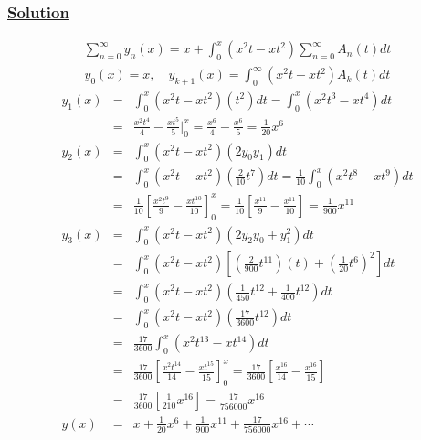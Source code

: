 \documentclass[11pt]{report}
\newcommand{\ubt}[1]{\textbf{\underline{#1}}}
\newcommand{\sps}{\\[0.2cm]}
\newcommand{\solution}{\subsubsection{\ubt{Solution}}}
\begin{document}
		\solution
		\begin{eqnarray*}
			\sum_{n=0}^\infty y_n(x) = x +\int_0^x (x^2 t - xt^2) \sum_{n=0}^\infty A_n(t) dt
		\end{eqnarray*}
		\begin{eqnarray*}
			y_0(x) = x,\quad y_{k+1}(x) = \int_0^\infty (x^2t-xt^2)A_k(t)dt
		\end{eqnarray*}
		\begin{eqnarray*}
			y_1(x) &=& \int_0^x (x^2t-xt^2)(t^2)dt = \int_0^x(x^2t^3-xt^4)dt\sps
			&=& \frac{x^2t^4}{4} - \frac{xt^5}{5}\Bigg|_0^x = \frac{x^6}{4} - \frac{x^6}{5} = \frac{1}{20}x^6\sps
			y_2(x) &=& \int_0^x(x^2t - xt^2)(2y_0y_1)dt\sps
			&=&\int_0^x(x^2t-xt^2)\left(\frac{2}{10}t^7\right)dt = \frac{1}{10}\int_0^x(x^2t^8-xt^9)dt\sps
			&=&\frac{1}{10}\left[ \frac{x^2t^9}{9} - \frac{xt^{10}}{10} \right]_0^x = \frac{1}{10}\left[\frac{x^{11}}{9} - \frac{x^{11}}{10}\right]= \frac{1}{900}x^{11}\sps
			y_3(x) &=& \int_0^x(x^2 t -xt^2)(2y_2y_0 + y_1^2)dt\sps
			&=&\int_0^x(x^2t -xt^2)\left[\left(\frac{2}{900}t^{11}\right)(t) + \left(\frac{1}{20}t^6\right)^2\right] dt\sps
			&=&\int_0^x\left(x^2 t - xt^2\right)\left(\frac{1}{450}t^{12} + \frac{1}{400}t^{12}\right)dt\sps
			&=&\int_0^x(x^2t -xt^2)\left(\frac{17}{3600}t^{12}\right)dt\sps
			&=& \frac{17}{3600}\int_0^x(x^2t^{13} - xt^{14})dt\sps
			&=& \frac{17}{3600}\left[\frac{x^2t^{14}}{14} - \frac{xt^{15}}{15}\right]_0^x = \frac{17}{3600}\left[ \frac{x^{16}}{14} - \frac{x^{16}}{15}\right]\sps
			&=&\frac{17}{3600}\left[ \frac{1}{210}x^{16}\right] = \frac{17}{756000}x^{16}\sps
			y(x) &=& x+ \frac{1}{20}x^6 + \frac{1}{900}x^{11} + \frac{17}{756000}x^{16} + \cdots
		\end{eqnarray*}
	
\end{document}
